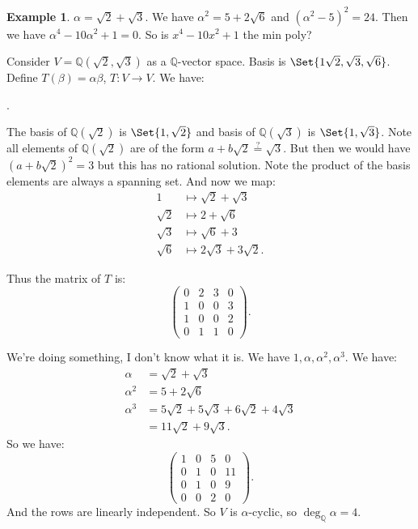 \documentclass[9pt,reqno,twoside]{amsbook}
\theoremstyle{plain}
\numberwithin{section}{chapter}
\numberwithin{equation}{chapter}
\theoremstyle{definition}
\newtheorem{Ex}[theorem]{Example}
\theoremstyle{remark}
\theoremstyle{plain}
\newcommand{\Q}{\mathbb{Q}}
\newcommand{\bee}{\begin{equation}\begin{aligned}}
\newcommand{\eee}{\end{aligned}\end{equation}}
\newcommand{\lpar}{\left(}
\newcommand{\rpar}{\right)}
\begin{document}
\begin{Ex}
$\alpha = \sqrt{2} + \sqrt{3}$. We have $\alpha^2 = 5 + 2\sqrt{6}$ and $(\alpha^2 - 5)^2 = 24$. Then we have $\alpha^4 - 10\alpha^2 + 1 = 0$. So is $x^4 - 10x^2 + 1$ the min poly?


Consider $V = \Q(\sqrt{2},\sqrt{3})$ as a $\Q$-vector space. Basis is $\Set{1 \sqrt{2},\sqrt{3},\sqrt{6}}$. Define $T(\beta) = \alpha\beta$, $T:V \to V$. We have:
\begin{center}
.
\end{center}
The basis of $\Q(\sqrt{2})$ is $\Set{1,\sqrt{2}}$ and basis of $\Q(\sqrt{3})$ is $\Set{1,\sqrt{3}}$. Note all elements of $\Q(\sqrt{2})$ are of the form $a + b\sqrt{2} \overset{?}{=} \sqrt{3}$. But then we would have $(a + b\sqrt{2})^2 = 3$ but this has no rational solution. Note the product of the basis elements are always a spanning set. And now we map:
\bee
1 &\mapsto \sqrt{2} + \sqrt{3}\\
\sqrt{2} &\mapsto 2 + \sqrt{6}\\
\sqrt{3} &\mapsto \sqrt{6} + 3\\
\sqrt{6} &\mapsto 2\sqrt{3} + 3 \sqrt{2}.
\eee

Thus the matrix of $T$ is:
$$
\lpar 
\begin{matrix}
0 & 2 & 3 & 0\\
1 & 0 & 0 & 3\\
1 & 0 & 0 & 2\\
0 & 1 & 1 & 0
\end{matrix} \rpar .
$$

We're doing something, I don't know what it is. We have $1,\alpha, \alpha^2, \alpha^3$. We have: \bee
\alpha &= \sqrt{2} + \sqrt{3}\\
\alpha^2 &= 5+ 2\sqrt{6}\\
\alpha^3 &= 5\sqrt{2} + 5 \sqrt{3} + 6\sqrt{2} + 4\sqrt{3}\\
&= 11\sqrt{2} + 9\sqrt{3}.
\eee
So we have:
$$
\lpar 
\begin{matrix}
1 & 0 & 5 & 0\\
0 & 1 & 0 & 11\\
0 & 1 & 0 & 9\\
0 & 0 & 2 & 0
\end{matrix} \rpar .
$$
And the rows are linearly independent. So $V$ is $\alpha$-cyclic, so $\deg_{\Q}\alpha = 4$. 
\end{Ex}
\end{document}
